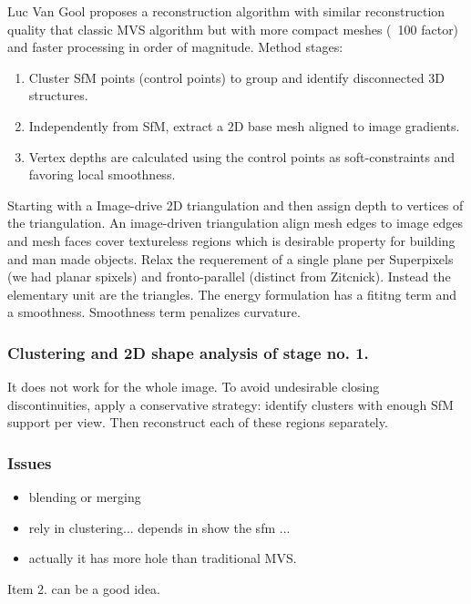 \documentclass{article}
\begin{document}
Luc Van Gool proposes a reconstruction algorithm with similar reconstruction quality that classic MVS algorithm but with more compact meshes (~100 factor) and faster processing in order of magnitude. Method stages:

\begin{enumerate} 
	\item Cluster SfM points (control points) to group and identify disconnected 3D structures. 
	\item Independently from SfM, extract a 2D base mesh aligned to image gradients. 
	\item Vertex depths are calculated using the control points as soft-constraints and favoring local smoothness. 
\end{enumerate} 

Starting with a Image-drive 2D triangulation and then assign depth to vertices of the triangulation. 
An image-driven triangulation align mesh edges to image edges and mesh faces cover textureless regions which is desirable property for building and man made objects. Relax the requerement of a single plane per Superpixels (we had planar spixels) and fronto-parallel (distinct from Zitcnick). Instead the elementary unit are the triangles. The energy formulation has a fititng term and a smoothness. Smoothness term penalizes curvature.

\subsubsection*{Clustering and 2D shape analysis of stage no. 1.} 
It does not work for the whole image. To avoid undesirable closing discontinuities, apply a conservative strategy: identify clusters with enough SfM support per view. Then reconstruct each of these regions separately.

\subsubsection*{Issues}
\begin{itemize}
	\item blending or merging  
	\item rely in clustering... depends in show the sfm ...
	\item actually it has more hole than traditional MVS. 
\end{itemize}

Item 2. can be a good idea.
 
\subsection{ \cite{vlad15} }
\end{document}
